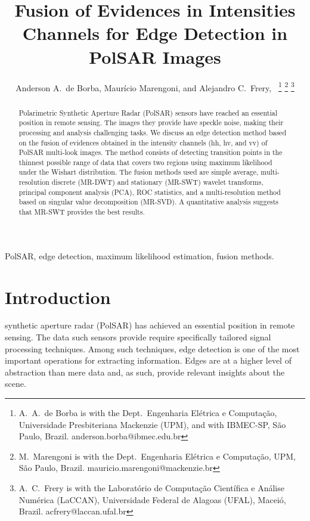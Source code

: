 \documentclass[journal]{IEEEtran}
\begin{document}
\title{Fusion of Evidences in Intensities Channels for Edge Detection in PolSAR Images}
\author{Anderson A.\ de Borba, Maurício Marengoni, and Alejandro C.\ Frery,~%
\thanks{A.\ A.\ de Borba is with the Dept.\ Engenharia Elétrica e Computação, Universidade Presbiteriana Mackenzie (UPM), and with IBMEC-SP, São Paulo, Brazil. anderson.borba@ibmec.edu.br}
\thanks{M.\ Marengoni is with the Dept.\ Engenharia Elétrica e Computação,
UPM, São Paulo, Brazil. mauricio.marengoni@mackenzie.br}
\thanks{A.\ C.\ Frery is with the Laboratório de Computação Científica e Análise Numérica (LaCCAN), Universidade Federal de Alagoas (UFAL), Maceió, Brazil. acfrery@laccan.ufal.br}}

\maketitle

\begin{abstract}
Polarimetric Synthetic Aperture Radar (PolSAR) sensors have reached an essential position in remote sensing. 
The images they provide have speckle noise, making their processing and analysis challenging tasks. 
We discuss an edge detection method based on the fusion of evidences obtained in the intensity channels (hh, hv, and vv) of PolSAR multi-look images. 
The method consists of detecting transition points in the thinnest possible range of data that covers two regions using maximum likelihood under the Wishart distribution. 
The fusion methods used are 
simple average, 
multi-resolution discrete (MR-DWT) and 
stationary (MR-SWT) wavelet transforms, 
principal component analysis (PCA), 
ROC statistics, 
and a multi-resolution method based on singular value decomposition (MR-SVD). 
A quantitative analysis suggests that MR-SWT provides the best results.
\end{abstract}

\begin{IEEEkeywords}
PolSAR, edge detection, maximum likelihood estimation, fusion methods. 
\end{IEEEkeywords}

\section{Introduction}\label{sec_01}
 synthetic aperture radar (PolSAR) has achieved an essential position in remote sensing. 
The data such sensors provide require specifically tailored signal processing techniques.
Among such techniques, edge detection is one of the most important operations for extracting information.
Edges are at a higher level of abstraction than mere data and, as such, provide relevant insights about the scene.
\end{document}
